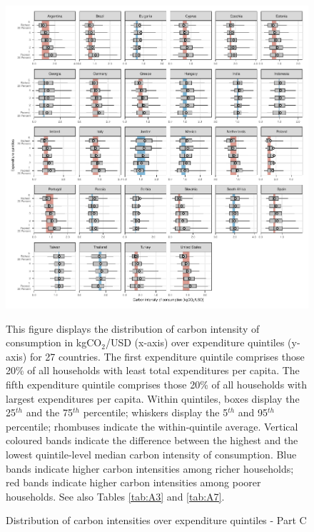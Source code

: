 \documentclass[12pt, a4paper]{article}
\newenvironment{subcaption}
{\strut
\vspace{-5pt}
\begin{minipage}[b]{0.9\textwidth}
  \hspace*{-\parindent}
  \footnotesize}
 {\end{minipage}}
\begin{document}
\clearpage

\begin{figure}[ht!]
  \centering
  \caption{Distribution of carbon intensities over expenditure quintiles - Part C} \label{fig:Quint_C}
  \includegraphics{1_Figures/Figures_Appendix/Figure_1_2017_Appendix_3}
  \begin{subcaption}
    This figure displays the distribution of carbon intensity of consumption in kgCO$_{2}$/USD (x-axis) over expenditure quintiles (y-axis) for 27 countries. The first expenditure quintile comprises those 20\% of all households with least total expenditures per capita. The fifth expenditure quintile comprises those 20\% of all households with largest expenditures per capita. Within quintiles, boxes display the 25$^{th}$ and the 75$^{th}$ percentile; whiskers display the 5$^{th}$ and 95$^{th}$ percentile; rhombuses indicate the within-quintile average. Vertical coloured bands indicate the difference between the highest and the lowest quintile-level median carbon intensity of consumption. Blue bands indicate higher carbon intensities among richer households; red bands indicate higher carbon intensities among poorer households. See also Tables \ref{tab:A3} and \ref{tab:A7}.
  \end{subcaption}

\end{figure}
\end{document}
